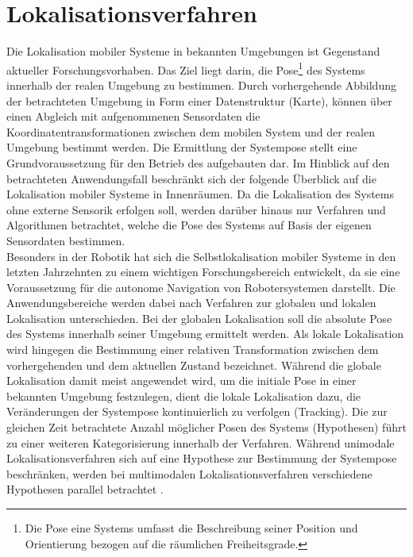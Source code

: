 \section{Lokalisationsverfahren}
\label{chap:mcl}
Die Lokalisation mobiler Systeme in bekannten Umgebungen ist Gegenstand aktueller Forschungsvorhaben. Das Ziel liegt darin, die Pose\footnote{Die Pose eine Systems umfasst die Beschreibung seiner Position und Orientierung bezogen auf die räumlichen Freiheitsgrade.} des Systems innerhalb der realen Umgebung zu bestimmen. Durch vorhergehende Abbildung der betrachteten Umgebung in Form einer Datenstruktur (Karte), können über einen Abgleich mit aufgenommenen Sensordaten die Koordinatentransformationen zwischen dem mobilen System und der realen Umgebung bestimmt werden. Die Ermittlung der Systempose stellt eine Grundvoraussetzung für den Betrieb des aufgebauten  dar. Im Hinblick auf den betrachteten Anwendungsfall beschränkt sich der folgende Überblick auf die Lokalisation mobiler Systeme in Innenräumen. Da die Lokalisation des Systems ohne externe Sensorik erfolgen soll, werden darüber hinaus nur Verfahren und Algorithmen betrachtet, welche die Pose des Systems auf Basis der eigenen Sensordaten bestimmen.\\

Besonders in der Robotik hat sich die Selbstlokalisation mobiler Systeme in den letzten Jahrzehnten zu einem wichtigen Forschungsbereich entwickelt, da sie eine Voraussetzung für die autonome Navigation von Robotersystemen darstellt. Die Anwendungsbereiche werden dabei nach Verfahren zur globalen und lokalen Lokalisation unterschieden. Bei der globalen Lokalisation soll die absolute Pose des Systems innerhalb seiner Umgebung ermittelt werden. Als lokale Lokalisation wird hingegen die Bestimmung einer relativen Transformation zwischen dem vorhergehenden und dem aktuellen Zustand bezeichnet. Während die globale Lokalisation damit meist angewendet wird, um die initiale Pose in einer bekannten Umgebung festzulegen, dient die lokale Lokalisation dazu, die Veränderungen der Systempose kontinuierlich zu verfolgen (Tracking). Die zur gleichen Zeit betrachtete Anzahl möglicher Posen des Systems (Hypothesen) führt zu einer weiteren Kategorisierung innerhalb der Verfahren. Während unimodale Lokalisationsverfahren sich auf eine Hypothese zur Bestimmung der Systempose beschränken, werden bei multimodalen Lokalisationsverfahren verschiedene Hypothesen parallel betrachtet \cite{Hertzberg2012}.
